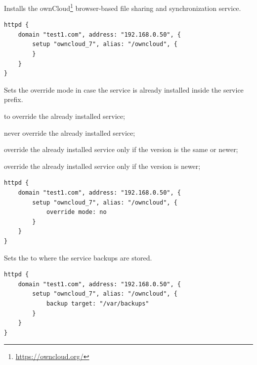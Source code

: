 Installs the ownCloud\footnote{\url{https://owncloud.org/}} browser-based
file sharing and synchronization service.

\begin{lstlisting}[style=Java]
httpd {
    domain "test1.com", address: "192.168.0.50", {
        setup "owncloud_7", alias: "/owncloud", {
        }
    }
}
\end{lstlisting}


Sets the override mode in case the service is already installed inside
the service prefix.
\begin{asparaitem}
\item {} to override the already installed service;
\item {} never override the already installed service;
\item {} override the already installed service only if the version is the same or newer;
\item {} override the already installed service only if the version is newer;
\end{asparaitem}

\begin{lstlisting}[style=Java]
httpd {
    domain "test1.com", address: "192.168.0.50", {
        setup "owncloud_7", alias: "/owncloud", {
            override mode: no
        }
    }
}
\end{lstlisting}


Sets the  to where the service backups are stored.

\begin{lstlisting}[style=Java]
httpd {
    domain "test1.com", address: "192.168.0.50", {
        setup "owncloud_7", alias: "/owncloud", {
            backup target: "/var/backups"
        }
    }
}
\end{lstlisting}


